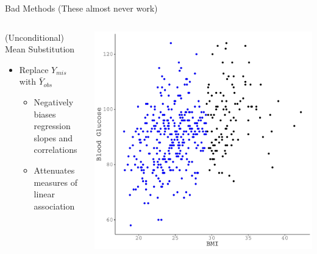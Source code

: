 \documentclass{beamer}\usepackage[]{graphicx}\usepackage[]{color}
\makeatletter
\def\maxwidth{ %
  \ifdim\Gin@nat@width>\linewidth
    \linewidth
  \else
    \Gin@nat@width
  \fi
}
\newenvironment{knitrout}{}{} %
\makeatother
\begin{document}

\begin{frame}{Bad Methods (These almost never work)}
  
  \begin{columns}
    \begin{column}{0.5\textwidth}
      
      (Unconditional) Mean Substitution
      \begin{itemize}
      \item Replace $Y_{mis}$ with $\bar{Y}_{obs}$
        \begin{itemize}
        \item Negatively biases regression slopes and correlations
        \item Attenuates measures of linear association
        \end{itemize}
      \end{itemize}
      
    \end{column}
    \begin{column}{0.5\textwidth}
      
\begin{knitrout}\footnotesize
{}\color{fgcolor}

{\centering \includegraphics[width=\maxwidth]{figure/intro-unnamed-chunk-21-1} 

}


\end{knitrout}

\end{column}
\end{columns}

\end{frame}
\end{document}
